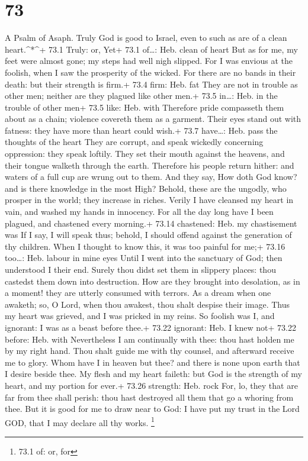 \hypertarget{section-72}{%
\section{73}\label{section-72}}

A Psalm of Asaph.  Truly God is good to Israel, even to such
as are of a clean heart.\^{}*\^{}+ 73.1 Truly: or, Yet+ 73.1 of\ldots:
Heb. clean of heart  But as for me, my feet were almost
gone; my steps had well nigh slipped.  For I was envious at
the foolish, when I saw the prosperity of the wicked.  For
there are no bands in their death: but their strength is firm.+ 73.4
firm: Heb. fat  They are not in trouble as other men;
neither are they plagued like other men.+ 73.5 in\ldots: Heb. in the
trouble of other men+ 73.5 like: Heb. with  Therefore pride
compasseth them about as a chain; violence covereth them as a garment.
 Their eyes stand out with fatness: they have more than
heart could wish.+ 73.7 have\ldots: Heb. pass the thoughts of the heart
 They are corrupt, and speak wickedly concerning oppression:
they speak loftily.  They set their mouth against the
heavens, and their tongue walketh through the earth. 
Therefore his people return hither: and waters of a full cup are wrung
out to them.  And they say, How doth God know? and is there
knowledge in the most High?  Behold, these are the ungodly,
who prosper in the world; they increase in riches.  Verily
I have cleansed my heart in vain, and washed my hands in innocency.
 For all the day long have I been plagued, and chastened
every morning.+ 73.14 chastened: Heb. my chastisement was 
If I say, I will speak thus; behold, I should offend against the
generation of thy children.  When I thought to know this,
it was too painful for me;+ 73.16 too\ldots: Heb. labour in mine eyes
 Until I went into the sanctuary of God; then understood I
their end.  Surely thou didst set them in slippery places:
thou castedst them down into destruction.  How are they
brought into desolation, as in a moment! they are utterly consumed with
terrors.  As a dream when one awaketh; so, O Lord, when
thou awakest, thou shalt despise their image.  Thus my
heart was grieved, and I was pricked in my reins.  So
foolish was I, and ignorant: I was as a beast before thee.+ 73.22
ignorant: Heb. I knew not+ 73.22 before: Heb. with 
Nevertheless I am continually with thee: thou hast holden me by my right
hand.  Thou shalt guide me with thy counsel, and afterward
receive me to glory.  Whom have I in heaven but thee? and
there is none upon earth that I desire beside thee.  My
flesh and my heart faileth: but God is the strength of my heart, and my
portion for ever.+ 73.26 strength: Heb. rock  For, lo, they
that are far from thee shall perish: thou hast destroyed all them that
go a whoring from thee.  But it is good for me to draw near
to God: I have put my trust in the Lord GOD, that I may declare all thy
works. \footnote{73.1 of: or, for}

